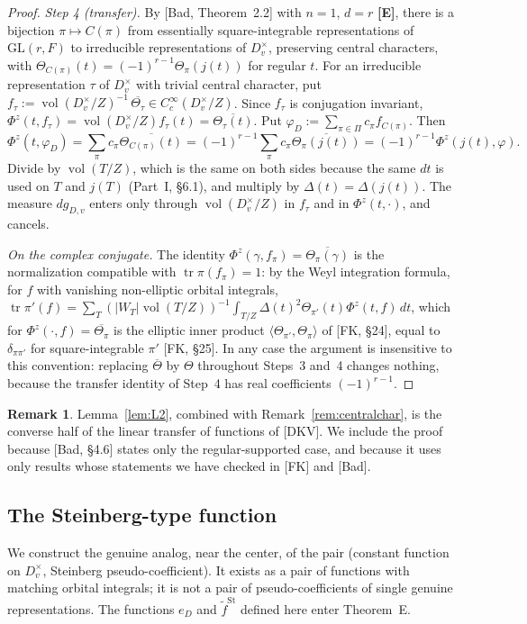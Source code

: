 \documentclass[12pt]{article}
\newcommand{\ov}[1]{\overline{#1}}
\newcommand{\tr}{\operatorname{tr}}
\newcommand{\vol}{\operatorname{vol}}
\newcommand{\GL}{\mathrm{GL}}
\newcommand{\St}{\mathrm{St}}
\newcommand{\Ev}{\textbf{[E]}}
\theoremstyle{plain}
\theoremstyle{definition}
\newtheorem{remark}[theorem]{Remark}
\begin{document}
\begin{proof}
\emph{Step 4 (transfer).} By [Bad, Theorem~2.2] with $n=1$, $d=r$ \Ev, there is a bijection $\pi\mapsto C(\pi)$ from essentially square-integrable representations of $\GL(r,F)$ to irreducible representations of $D_v^\times$, preserving central characters, with $\Theta_{C(\pi)}(t)=(-1)^{r-1}\Theta_\pi(j(t))$ for regular $t$. For an irreducible representation $\tau$ of $D_v^\times$ with trivial central character, put $f_\tau:=\vol(D_v^\times/Z)^{-1}\,\ov{\Theta_\tau}\in C_c^\infty(D_v^\times/Z)$. Since $f_\tau$ is conjugation invariant, $\Phi^z(t,f_\tau)=\vol(D_v^\times/Z)f_\tau(t)=\ov{\Theta_\tau(t)}$. Put $\varphi_D:=\sum_{\pi\in\Pi}c_\pi f_{C(\pi)}$. Then
\[ \Phi^z(t,\varphi_D)=\sum_\pi c_\pi\ov{\Theta_{C(\pi)}(t)}=(-1)^{r-1}\sum_\pi c_\pi\ov{\Theta_\pi(j(t))}=(-1)^{r-1}\Phi^z(j(t),\varphi). \]
Divide by $\vol(T/Z)$, which is the same on both sides because the same $dt$ is used on $T$ and $j(T)$ (Part~I, \S6.1), and multiply by $\Delta(t)=\Delta(j(t))$. The measure $dg_{D,v}$ enters only through $\vol(D_v^\times/Z)$ in $f_\tau$ and in $\Phi^z(t,\cdot)$, and cancels.

\emph{On the complex conjugate.} The identity $\Phi^z(\gamma,f_\pi)=\ov{\Theta_\pi(\gamma)}$ is the normalization compatible with $\tr\pi(f_\pi)=1$: by the Weyl integration formula, for $f$ with vanishing non-elliptic orbital integrals, $\tr\pi'(f)=\sum_T(|W_T|\vol(T/Z))^{-1}\int_{T/Z}\Delta(t)^2\Theta_{\pi'}(t)\Phi^z(t,f)\,dt$, which for $\Phi^z(\cdot,f)=\ov{\Theta_\pi}$ is the elliptic inner product $\langle\Theta_{\pi'},\Theta_\pi\rangle$ of [FK, \S24], equal to $\delta_{\pi\pi'}$ for square-integrable $\pi'$ [FK, \S25]. In any case the argument is insensitive to this convention: replacing $\ov{\Theta}$ by $\Theta$ throughout Steps~3 and~4 changes nothing, because the transfer identity of Step~4 has real coefficients $(-1)^{r-1}$.
\end{proof}

\begin{remark}
Lemma~\ref{lem:L2}, combined with Remark~\ref{rem:centralchar}, is the converse half of the linear transfer of functions of [DKV]. We include the proof because [Bad, \S4.6] states only the regular-supported case, and because it uses only results whose statements we have checked in [FK] and [Bad].
\end{remark}


\subsection{The Steinberg-type function}\label{subsec:steinberg}
We construct the genuine analog, near the center, of the pair (constant function on $D_v^\times$, Steinberg pseudo-coefficient). It exists as a pair of functions with matching orbital integrals; it is not a pair of pseudo-coefficients of single genuine representations. The functions $e_D$ and $\tilde f^{\St}$ defined here enter Theorem~E.
\end{document}
